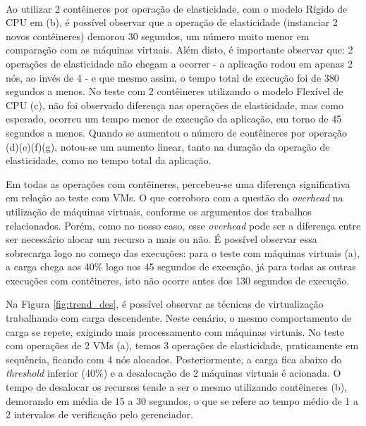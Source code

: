 \documentclass[twoside,english,brazilian]{UNISINOSartigo}
\begin{document}
\begin{figure}[ht!]
\vspace{-0.4\baselineskip}
\\
\end{figure}

Ao utilizar 2 contêineres por operação de elasticidade, com o modelo Rígido de CPU em (b), é possível observar que a operação de elasticidade (instanciar 2 novos contêineres) demorou 30 segundos, um número muito menor em comparação com as máquinas virtuais. Além disto, é importante observar que: 2 operações de elasticidade não chegam a ocorrer - a aplicação rodou em apenas 2 nós, ao invés de 4 - e que mesmo assim, o tempo total de execução foi de 380 segundos a menos. No teste com 2 contêineres utilizando o modelo Flexível de CPU (c), não foi observado diferença nas operações de elasticidade, mas como esperado, ocorreu um tempo menor de execução da aplicação, em torno de 45 segundos a menos. Quando se aumentou o número de contêineres por operação (d)(e)(f)(g), notou-se um aumento linear, tanto na duração da operação de elasticidade, como no tempo total da aplicação. 

Em todas as operações com contêineres, percebeu-se uma diferença significativa em relação ao teste com VMs. O que corrobora com a questão do \textit{overhead} na utilização de máquinas virtuais, conforme os argumentos dos trabalhos relacionados. Porém, como no nosso caso, esse \textit{overhead} pode ser a diferença entre ser necessário alocar um recurso a mais ou não. É possível observar essa sobrecarga logo no começo das execuções: para o teste com máquinas virtuais (a), a carga chega aos 40\% logo nos 45 segundos de execução, já para todas as outras execuções com contêineres, isto não ocorre antes dos 130 segundos de execução.

Na Figura \ref{fig:trend_des}, é possível observar as técnicas de virtualização trabalhando com carga descendente. Neste cenário, o mesmo comportamento de carga se repete, exigindo mais processamento com máquinas virtuais. No teste com operações de 2 VMs (a), temos 3 operações de elasticidade, praticamente em sequência, ficando com 4 nós alocados. Posteriormente, a carga fica abaixo do \textit{threshold} inferior (40\%) e a desalocação de 2 máquinas virtuais é acionada. O tempo de desalocar os recursos tende a ser o mesmo utilizando contêineres (b), demorando em média de 15 a 30 segundos, o que se refere ao tempo médio de 1 a 2 intervalos de verificação pelo gerenciador. 
\end{document}
